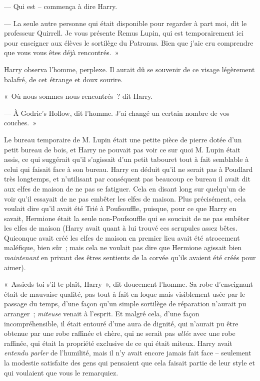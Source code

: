 --- Qui est -- commença à dire Harry.

--- La seule autre personne qui était disponible pour regarder à part moi, dit le professeur Quirrell. Je vous présente Remus Lupin, qui est temporairement ici pour enseigner aux élèves le sortilège du Patronus. Bien que j'aie cru comprendre que vous vous êtes déjà rencontrés.~»

Harry observa l'homme, perplexe. Il aurait dû se souvenir de ce visage légèrement balafré, de cet étrange et doux sourire.

«~Où nous sommes-nous rencontrés~? dit Harry.

--- À Godric's Hollow, dit l'homme. J'ai changé un certain nombre de vos couches.~»

\later

Le bureau temporaire de M. Lupin était une petite pièce de pierre dotée d'un petit bureau de bois, et Harry ne pouvait pas voir ce sur quoi M. Lupin était assis, ce qui suggérait qu'il s'agissait d'un petit tabouret tout à fait semblable à celui qui faisait face à son bureau. Harry en déduit qu'il ne serait pas à Poudlard très longtemps, et n'utilisant par conséquent pas beaucoup ce bureau il avait dit aux elfes de maison de ne pas se fatiguer. Cela en disant long sur quelqu'un de voir qu'il essayait de ne pas embêter les elfes de maison. Plus précisément, cela voulait dire qu'il avait été Trié à Poufsouffle, puisque, pour ce que Harry en savait, Hermione était la seule non-Poufsouffle qui se souciait de ne pas embêter les elfes de maison (Harry avait quant à lui trouvé ces scrupules assez bêtes. Quiconque avait créé les elfes de maison en premier lieu avait été atrocement maléfique, bien sûr~; mais cela ne voulait pas dire que Hermione agissait bien \emph{maintenant} en privant des êtres sentients de la corvée qu'ils avaient été créés pour aimer).

«~Assieds-toi s'il te plaît, Harry~», dit doucement l'homme. Sa robe d'enseignant était de mauvaise qualité, pas tout à fait en loque mais visiblement usée par le passage du temps, d'une façon qu'un simple sortilège de réparation n'aurait pu arranger~; \emph{miteuse} venait à l'esprit. Et malgré cela, d'une façon incompréhensible, il était entouré d'une aura de dignité, qui n'aurait pu être obtenue par une robe raffinée et chère, qui ne serait pas \emph{allée} avec une robe raffinée, qui était la propriété exclusive de ce qui était miteux. Harry avait \emph{entendu parler} de l'humilité, mais il n'y avait encore jamais fait face -- seulement la modestie satisfaite des gens qui pensaient que cela faisait partie de leur style et qui voulaient que vous le remarquiez.

